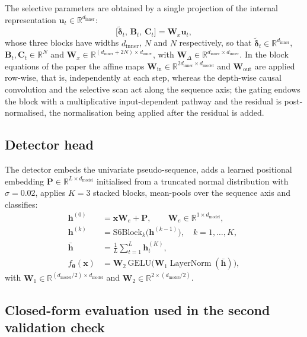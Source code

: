 \documentclass[11pt,a4paper]{article}
\newcommand{\R}{\mathbb{R}}
\newcommand{\vx}{\bm{x}}
\newcommand{\vh}{\bm{h}}
\newcommand{\vu}{\bm{u}}
\newcommand{\vdelta}{\bm{\delta}}
\newcommand{\vtheta}{\bm{\theta}}
\newcommand{\mB}{\bm{B}}
\newcommand{\mC}{\bm{C}}
\DeclareMathOperator{\LN}{LayerNorm}
\begin{document}
The selective parameters are obtained by a single projection of the
internal representation $\vu_{t}\in\R^{d_{\mathrm{inner}}}$:
\begin{equation}
\bigl[\tilde{\vdelta}_{t},\,\mB_{t},\,\mC_{t}\bigr]
=\bm{W}_{x}\vu_{t},
\label{eq:selproj}
\end{equation}
whose three blocks have widths $d_{\mathrm{inner}}$, $N$ and $N$
respectively, so that
$\tilde{\vdelta}_{t}\in\R^{d_{\mathrm{inner}}}$,
$\mB_{t},\mC_{t}\in\R^{N}$ and
$\bm{W}_{x}\in\R^{(d_{\mathrm{inner}}+2N)\times d_{\mathrm{inner}}}$,
with
$\bm{W}_{\Delta}\in\R^{d_{\mathrm{inner}}\times d_{\mathrm{inner}}}$.
In the block equations of the paper the affine maps
$\bm{W}_{\mathrm{in}}\in\R^{2d_{\mathrm{inner}}\times d_{\mathrm{model}}}$
and $\bm{W}_{\mathrm{out}}$ are applied row-wise, that is,
independently at each step, whereas the depth-wise causal convolution
and the selective scan act along the sequence axis; the gating endows
the block with a multiplicative input-dependent pathway and the
residual is post-normalised, the normalisation being applied after the
residual is added.

\subsection{Detector head}

The detector embeds the univariate pseudo-sequence, adds a learned
positional embedding $\bm{P}\in\R^{L\times d_{\mathrm{model}}}$
initialised from a truncated normal distribution with $\sigma=0.02$,
applies $K=3$ stacked blocks, mean-pools over the sequence axis and
classifies:
\begin{align}
\vh^{(0)}&=\vx\bm{W}_{e}+\bm{P},\qquad
\bm{W}_{e}\in\R^{1\times d_{\mathrm{model}}},\\
\vh^{(k)}&=\mathrm{S6Block}_{k}\bigl(\vh^{(k-1)}\bigr),
\quad k=1,\dots,K,\\
\bar{\vh}&=\frac{1}{L}\sum_{t=1}^{L}\vh^{(K)}_{t},\\
f_{\vtheta}(\vx)&=\bm{W}_{2}\,\mathrm{GELU}
\bigl(\bm{W}_{1}\LN(\bar{\vh})\bigr),
\end{align}
with
$\bm{W}_{1}\in\R^{(d_{\mathrm{model}}/2)\times d_{\mathrm{model}}}$
and $\bm{W}_{2}\in\R^{2\times(d_{\mathrm{model}}/2)}$.

\subsection{Closed-form evaluation used in the second validation check}
\end{document}
